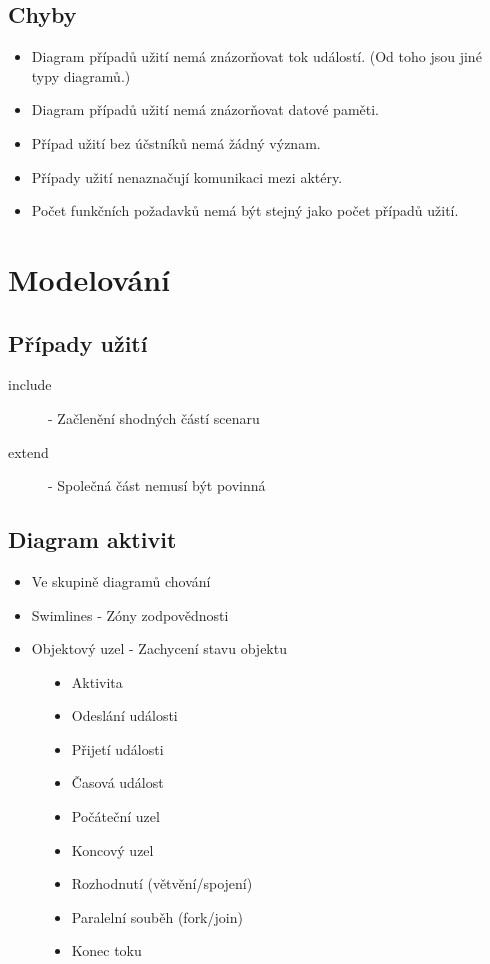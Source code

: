 \documentclass{szzclass}
\begin{document}
\subsection{Chyby}
\begin{itemize}
\item Diagram případů užití nemá znázorňovat tok událostí. (Od toho jsou jiné typy diagramů.)
\item Diagram případů užití nemá znázorňovat datové paměti.
\item Případ užití bez účstníků nemá žádný význam.
\item Případy užití nenaznačují komunikaci mezi aktéry.
\item Počet funkčních požadavků nemá být stejný jako počet případů užití.
\end{itemize}

\section{Modelování}
\subsection{Případy užití}
\begin{description}
\item[include] - Začlenění shodných částí scenaru
\item[extend] - Společná část nemusí být povinná
\end{description}

\subsection{Diagram aktivit}
\begin{itemize}
\item Ve skupině diagramů chování
\item Swimlines - Zóny zodpovědnosti
\item Objektový uzel - Zachycení stavu objektu
\end{itemize}

\begin{figure}[ht!]
\centering
\begin{minipage}{.5\textwidth}
\begin{itemize}
    \item Aktivita
    \item Odeslání události
    \item Přijetí události
    \item Časová událost
\end{itemize}
\end{minipage}%
\begin{minipage}{.5\textwidth}
\begin{itemize}
    \item Počáteční uzel
    \item Koncový uzel
    \item Rozhodnutí (větvění/spojení)
    \item Paralelní souběh (fork/join)
    \item Konec toku
\end{itemize}
\end{minipage}
\end{figure}
\end{document}
